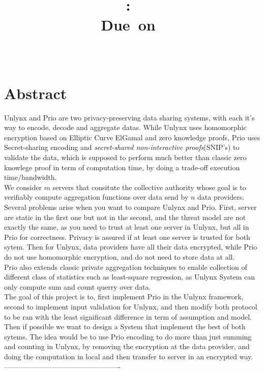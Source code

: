 \documentclass{article}
\title{
\logoepfl
\vspace{2in}
\textmd{\textbf{\hmwkClass:\ \hmwkTitle}}\\
\normalsize\vspace{0.1in}\small{Due\ on\ \hmwkDueDate}\\
\vspace{0.1in}\large{\textit{\hmwkClassInstructor\ \hmwkClassTime}}
\author{\textbf{\hmwkAuthorName}}
\vspace{3in}
}
\begin{document}
\maketitle

\newpage
\section*{Abstract}
Unlynx and Prio are two privacy-preserving data sharing systems, with each it's way to encode, decode and aggregate datas. While Unlynx uses homomorphic encryption based on Elliptic Curve ElGamal and zero knowledge proofs, Prio uses Secret-sharing encoding and \textit{secret-shared non-interactive proofs}(SNIP's) to validate the data, which is supposed to perform much better than classic zero knowlege proof in term of computation time, by doing a trade-off execution time/bandwidth.\\
We consider $m$ servers that consitute the collective authority whose goal is to verifiably compute aggregation functions over data send by $n$ data providers.\\
Several problems arise when you want to compare Unlynx and Prio. First, server are static in the first one but not in the second, and the threat model are not exactly the same, as you need to trust at least one server in Unlynx, but all in Prio for correctness. Privacy is assured if at least one server is trusted for both sytem. Then for Unlynx, data providers have all their data encrypted, while Prio do not use homomorphic encryption, and do not need to store data at all.\\
Prio also extends classic private aggregation techniques to enable collection of different class of statistics such as least-square regression, as Unlynx System can only compute sum and count querry over data.\\
The goal of this project is to, first implement Prio in the Unlynx framework, second to implement input validation for Unlynx, and then modify both protocol to be ran with the least significant difference in term of assumption and model.\\
Then if possible we want to design a System that implement the best of both sytems. The idea would be to use Prio encoding to do more than just summing and counting in Unlynx, by removing the encryption at the data provider, and doing the computation in local and then transfer to server in an encrypted way.\\
-------------------------------------------------
\end{document}
